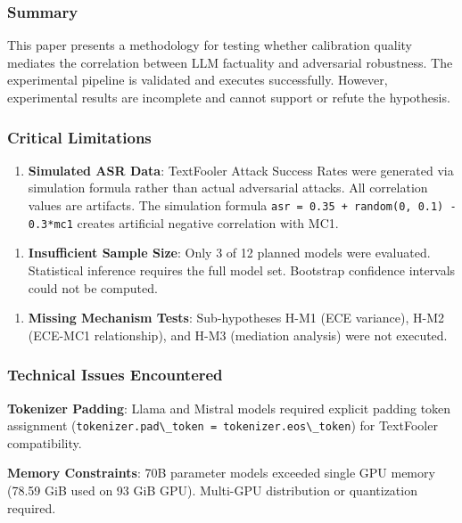 
\subsubsection{Summary}

This paper presents a methodology for testing whether calibration quality mediates the correlation between LLM factuality and adversarial robustness. The experimental pipeline is validated and executes successfully. However, experimental results are incomplete and cannot support or refute the hypothesis.

\subsubsection{Critical Limitations}

\begin{enumerate}
\item \textbf{Simulated ASR Data}: TextFooler Attack Success Rates were generated via simulation formula rather than actual adversarial attacks. All correlation values are artifacts. The simulation formula \texttt{asr = 0.35 + random(0, 0.1) - 0.3*mc1} creates artificial negative correlation with MC1.
\end{enumerate}

\begin{enumerate}
\item \textbf{Insufficient Sample Size}: Only 3 of 12 planned models were evaluated. Statistical inference requires the full model set. Bootstrap confidence intervals could not be computed.
\end{enumerate}

\begin{enumerate}
\item \textbf{Missing Mechanism Tests}: Sub-hypotheses H-M1 (ECE variance), H-M2 (ECE-MC1 relationship), and H-M3 (mediation analysis) were not executed.
\end{enumerate}

\subsubsection{Technical Issues Encountered}

\textbf{Tokenizer Padding}: Llama and Mistral models required explicit padding token assignment (\texttt{tokenizer.pad\textbackslash \_token = tokenizer.eos\textbackslash \_token}) for TextFooler compatibility.

\textbf{Memory Constraints}: 70B parameter models exceeded single GPU memory (78.59 GiB used on 93 GiB GPU). Multi-GPU distribution or quantization required.


